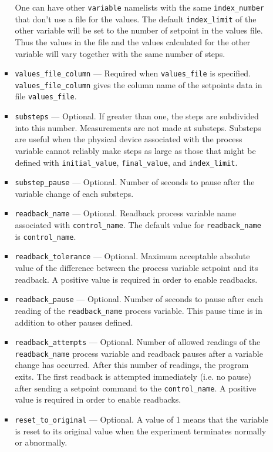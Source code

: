 \begin{itemize}
\begin{itemize}
\begin{itemize}
                One can have other \verb+variable+ namelists with the same \verb+index_number+
                that don't use a file for the values.
                The default {\verb+index_limit+} of the other variable will be
                set to the number of setpoint in the values file.
                Thus the values in the file and the values calculated for the other variable 
                will vary together with the same number of steps.
        \item {\verb+values_file_column+} --- Required when {\verb+values_file+} is specified.
                {\verb+values_file_column+} gives the column name of the setpoints data 
                in file {\verb+values_file+}. 
        \item {\verb+substeps+} --- Optional. If greater than one, the steps are subdivided into this number.
                Measurements are not made at substeps. Substeps are useful
                when the physical device associated with the process variable cannot reliably make 
                steps as large as those that might be defined with {\verb+initial_value+},
                {\verb+final_value+}, and {\verb+index_limit+}.
        \item {\verb+substep_pause+} --- Optional. Number of seconds to pause after the variable change of each substeps.
        \item {\verb+readback_name+} --- Optional. Readback process variable name 
                associated with {\verb+control_name+}. 
                The default value for {\verb+readback_name+} is {\verb+control_name+}.
        \item {\verb+readback_tolerance+} --- Optional. Maximum acceptable
                absolute value of the difference between the process variable
                setpoint and its readback. A positive value is required in order to enable readbacks.
        \item {\verb+readback_pause+} --- Optional. Number of seconds to pause after 
                each reading of the {\verb+readback_name+} process variable. 
                This pause time is in addition to other pauses defined.
        \item {\verb+readback_attempts+} --- Optional. Number of allowed readings 
                of the {\verb+readback_name+} process variable
                and readback pauses after a variable change has occurred. 
                After this number of readings, the program exits.
                The first readback is attempted immediately (i.e. no pause) after 
                sending a setpoint command to the {\verb+control_name+}.
                A positive value is required in order to enable readbacks.
        \item {\verb+reset_to_original+} --- Optional. A value of 1 means 
                that the variable is reset to its original value when the 
                experiment terminates normally or abnormally. 
\end{itemize}


\end{itemize}
\end{itemize}

